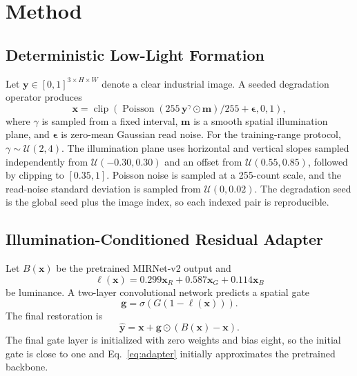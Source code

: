 \documentclass[10pt,journal]{IEEEtran}
\begin{document}
\section{Method}
\subsection{Deterministic Low-Light Formation}
Let $\mathbf{y}\in[0,1]^{3\times H\times W}$ denote a clear industrial image. A seeded degradation operator produces
\begin{equation}
\mathbf{x}=\operatorname{clip}\left(\operatorname{Poisson}\left(255\,\mathbf{y}^{\gamma}\odot\mathbf{m}\right)/255+\boldsymbol{\epsilon},0,1\right),
\end{equation}
where $\gamma$ is sampled from a fixed interval, $\mathbf{m}$ is a smooth spatial illumination plane, and $\boldsymbol{\epsilon}$ is zero-mean Gaussian read noise. For the training-range protocol, $\gamma\sim\mathcal{U}(2,4)$. The illumination plane uses horizontal and vertical slopes sampled independently from $\mathcal{U}(-0.30,0.30)$ and an offset from $\mathcal{U}(0.55,0.85)$, followed by clipping to $[0.35,1]$. Poisson noise is sampled at a 255-count scale, and the read-noise standard deviation is sampled from $\mathcal{U}(0,0.02)$. The degradation seed is the global seed plus the image index, so each indexed pair is reproducible.

\subsection{Illumination-Conditioned Residual Adapter}
Let $B(\mathbf{x})$ be the pretrained MIRNet-v2 output and
\begin{equation}
\ell(\mathbf{x})=0.299\mathbf{x}_R+0.587\mathbf{x}_G+0.114\mathbf{x}_B
\end{equation}
be luminance. A two-layer convolutional network predicts a spatial gate
\begin{equation}
\mathbf{g}=\sigma\left(G(1-\ell(\mathbf{x}))\right).
\end{equation}
The final restoration is
\begin{equation}
\hat{\mathbf{y}}=\mathbf{x}+\mathbf{g}\odot\left(B(\mathbf{x})-\mathbf{x}\right).
\label{eq:adapter}
\end{equation}
The final gate layer is initialized with zero weights and bias eight, so the initial gate is close to one and Eq.~\eqref{eq:adapter} initially approximates the pretrained backbone.
\end{document}

